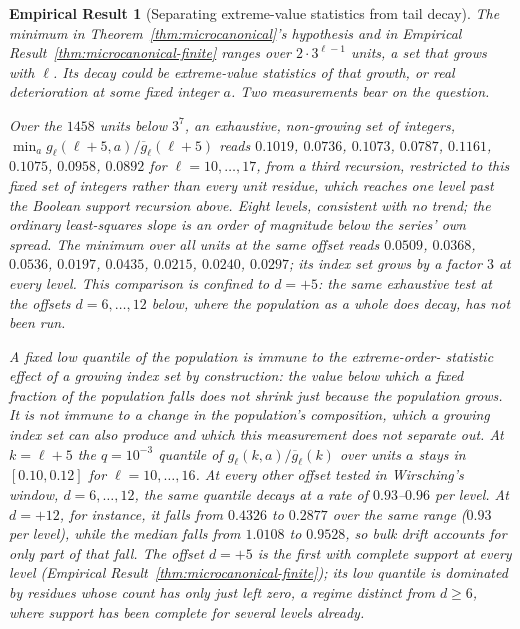 \documentclass[11pt]{article}
\newtheorem{empirical}[theorem]{Empirical Result}
\theoremstyle{remark}
\begin{document}
\begin{empirical}[Separating extreme-value statistics from tail decay]
\label{thm:quantile-diagnosis}
The minimum in Theorem~\ref{thm:microcanonical}'s hypothesis and in
Empirical Result~\ref{thm:microcanonical-finite} ranges over
$2\cdot3^{\ell-1}$ units, a set that grows with $\ell$. Its decay could
be extreme-value statistics of that growth, or real deterioration at
some fixed integer $a$. Two measurements bear on the question.

Over the $1458$ units below $3^7$, an exhaustive, non-growing set of
integers, $\min_ag_\ell(\ell+5,a)/\overline g_\ell(\ell+5)$ reads
$0.1019$, $0.0736$, $0.1073$, $0.0787$, $0.1161$, $0.1075$, $0.0958$,
$0.0892$ for $\ell=10,\ldots,17$, from a third recursion, restricted to
this fixed set of integers rather than every unit residue, which
reaches one level past the Boolean support recursion above. Eight
levels, consistent with no trend;
the ordinary least-squares slope is an order of magnitude below the
series' own spread. The minimum over all units at the same offset
reads $0.0509$, $0.0368$, $0.0536$, $0.0197$, $0.0435$, $0.0215$,
$0.0240$, $0.0297$; its index set grows by a factor $3$ at every
level. This comparison is confined to $d=+5$: the same exhaustive test
at the offsets $d=6,\ldots,12$ below, where the population as a whole
does decay, has not been run.

A fixed low quantile of the population is immune to the extreme-order-
statistic effect of a growing index set by construction: the value
below which a fixed fraction of the population falls does not shrink
just because the population grows. It is not immune to a change in the
population's composition, which a growing index set can also produce
and which this measurement does not separate out. At $k=\ell+5$ the
$q=10^{-3}$ quantile of
$g_\ell(k,a)/\overline g_\ell(k)$ over units $a$ stays in
$[0.10,0.12]$ for $\ell=10,\ldots,16$. At every other offset tested in
Wirsching's window, $d=6,\ldots,12$, the same quantile decays at a
rate of $0.93$--$0.96$ per level. At $d=+12$, for instance, it falls
from $0.4326$ to $0.2877$ over the same range ($0.93$ per level),
while the median falls from $1.0108$ to $0.9528$, so bulk drift
accounts for only part of that fall. The offset $d=+5$ is the first
with complete support at every level (Empirical
Result~\ref{thm:microcanonical-finite}); its low quantile is dominated
by residues whose count has only just left zero, a regime distinct
from $d\ge6$, where support has been complete for several levels
already.


\end{empirical}
\end{document}
